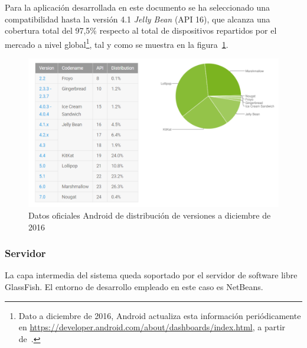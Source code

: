 Para la aplicación desarrollada en este documento se ha seleccionado una compatibilidad hasta la versión 4.1 \textit{Jelly Bean} (API 16), que alcanza una cobertura total del 97,5\% respecto al total de dispositivos repartidos por el mercado a nivel global\footnote{Dato a diciembre de 2016, Android actualiza esta información periódicamente en \url{https://developer.android.com/about/dashboards/index.html}, a partir de~\cite{AnDev}.}, tal y como se muestra en la figura~\ref{fig:androidDistribution}.

\begin{figure}
	\centering
	\includegraphics[width=\linewidth,height=\textheight,keepaspectratio]{Images/androidDistribution}
	\caption{Datos oficiales Android de distribución de versiones a diciembre de 2016}
	\label{fig:androidDistribution}
\end{figure}

\subsubsection{Servidor}

La capa intermedia del sistema queda soportado por el servidor de software libre GlassFish. El entorno de desarrollo empleado en este caso es NetBeans.

